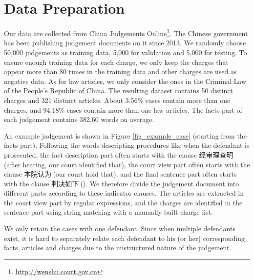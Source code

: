 \section{Data Preparation} 
Our data are collected from China Judgements Online\footnote{\url{http://wenshu.court.gov.cn}}. The Chinese government has been publishing judgement documents on it since 2013.
We randomly choose 50,000 judgements as training data, 5,000 for validation and 5,000 for testing. To ensure enough training data for each charge, we only keep the charges that appear more than 80 times in the training data and other charges are used as negative data. As for law articles, we only consider the ones in the Criminal Law of the People's Republic of China. The resulting dataset contains 50 distinct charges and 321 distinct articles. About 3.56\% cases contain more than one charges, and 94.18\% cases contain more than one law articles. 
The facts part of each judgement contains 382.60 words on average.



An example judgement is shown in Figure \ref{fig_example_case} (starting from the facts part).
Following the words descripting procedures like when the defendant is prosecuted, the fact description part often starts with the clause 经审理查明$\ $(after hearing, our court identified that), the court view part often starts with the clause 本院认为$\ $(our court hold that), and the final sentence part often starts with the clause 判决如下$\ $(). 
We therefore divide the judgement document into different parts according to these indicator clauses. The articles are extracted in the court view part by regular expressions, and the charges are identified in the sentence part using string matching with a manually built charge list.

We only retain the cases with one defendant. Since when multiple defendants exist, it is hard to separately relate each defendant to his (or her) corresponding facts, articles and charges due to the unstructured nature of the judgement.



